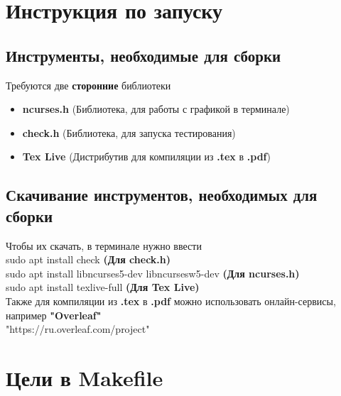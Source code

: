 \documentclass[a4paper, 12pt]{report}
\begin{document}
\clearpage
\chapter{Инструкция по запуску}

\section{Инструменты, необходимые для сборки}
Требуются две \textbf{сторонние} библиотеки
\begin{itemize}
    \item \textbf{ncurses.h} (Библиотека, для работы с графикой в терминале)
    \item \textbf{check.h} (Библиотека, для запуска тестирования)
    \item \textbf{Tex Live} (Дистрибутив для компиляции из \textbf{.tex} в \textbf{.pdf})
\end{itemize}

\section{Скачивание инструментов, необходимых для сборки}
Чтобы их скачать, в терминале нужно ввести\\
sudo apt install check \textbf{(Для check.h)}\\
sudo apt install libncurses5-dev libncursesw5-dev \textbf{(Для ncurses.h)}\\
sudo apt install texlive-full \textbf{(Для Tex Live)}\\
Также для компиляции из \textbf{.tex} в \textbf{.pdf} можно использовать онлайн-сервисы, например \textbf{"Overleaf"}\\
"https://ru.overleaf.com/project"

\clearpage
\chapter{Цели в Makefile}
\end{document}
